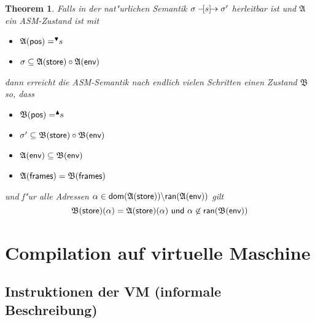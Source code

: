 \documentclass[german,10pt, a4paper, twocolumn]{scrartcl}
\newcommand{\natsemarr}[1]{\ensuremath{-\hspace*{-1.52mm}[#1]\hspace*{-1.61mm}\rightarrow}}
\newtheorem{theorem}{Theorem}[section]
\theoremstyle{definition}
\theoremstyle{remark}
\begin{document}
\begin{theorem}
	Falls in der nat"urlichen Semantik $\sigma \natsemarr{s}\sigma'$ herleitbar ist und $\mathfrak{A}$ ein ASM-Zustand ist mit
	\begin{itemize}
		\item $\mathfrak{A}(\mbox{\sffamily pos}) = ^{\blacktriangledown}\!\!s$
		\item $\sigma \subseteq \mathfrak{A}(\mbox{\sffamily store})\circ \mathfrak{A}(\text{\sffamily env})$
	\end{itemize}
	dann erreicht die ASM-Semantik nach endlich vielen Schritten einen Zustand $\mathfrak{B}$ so, dass
	\begin{itemize}
		\item $\mathfrak{B}(\mbox{\sffamily pos}) = ^{\blacktriangle}\!\!s$
		\item $\sigma ' \subseteq \mathfrak{B}(\mbox{\sffamily store})\circ\mathfrak{B}(\mbox{\sffamily env})$
		\item $\mathfrak{A}(\mbox{\sffamily env})\subseteq \mathfrak{B}(\mbox{\sffamily env})$
		\item $\mathfrak{A}(\mbox{\sffamily frames})= \mathfrak{B}(\mbox{\sffamily frames})$
	\end{itemize}
	und f"ur alle Adressen $\alpha \in \mbox{\sffamily dom}(\mathfrak{A}(\mbox{\sffamily store}))\backslash \mbox{\sffamily ran}(\mathfrak{A}(\mbox{\sffamily env}))$ gilt
	\begin{displaymath}
		\mathfrak{B}(\mbox{\sffamily store})(\alpha) = \mathfrak{A}(\mbox{\sffamily store})(\alpha)\ \mbox{\sffamily und } \alpha \not \in \mbox{\sffamily ran}(\mathfrak{B}(\mbox{\sffamily env}))
	\end{displaymath}
\end{theorem}

\section{Compilation auf virtuelle Maschine}

\subsection{Instruktionen der VM (informale Beschreibung)}
\end{document}
